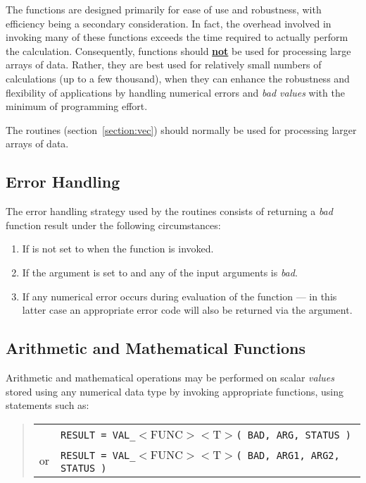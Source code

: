 The  functions are designed primarily for ease of use and
robustness, with efficiency being a secondary consideration.
In fact, the
overhead involved in invoking many of these functions exceeds the time
required to actually perform the calculation.
Consequently,  functions should {\bf \underline{not}} be used
for processing large arrays of data.
Rather, they are best used for relatively small numbers of calculations (up
to a few thousand), when they can enhance the robustness and flexibility of
applications by handling numerical errors and {\em bad values} with the
minimum of programming effort.

The  routines (section~\ref{section:vec}) should normally be
used for processing larger arrays of data.

\subsection{ Error Handling}
\label{section:val:error}

The error handling strategy used by the  routines consists of
returning a {\em bad} function result under the following circumstances:

\begin{enumerate}

\item If  is not set to  when the function
is invoked.

\item If the  argument is set to  and any of
the input arguments is {\em bad}.

\item If any numerical error occurs during evaluation of the function --- in
this latter case an appropriate error code will also be returned via the
 argument.

\end{enumerate}

\subsection{ Arithmetic and Mathematical Functions}

Arithmetic and mathematical operations may be performed on scalar {\em
values} stored using any numerical data type by invoking appropriate
 functions, using statements such as:

\begin{quote}
\begin{tabular}{rl}
& \verb#RESULT = VAL_#$<$FUNC$><$T$>$\verb#( BAD, ARG, STATUS )#\\
or & \verb#RESULT = VAL_#$<$FUNC$><$T$>$\verb#( BAD, ARG1, ARG2, STATUS )#
\end{tabular}
\end{quote}

